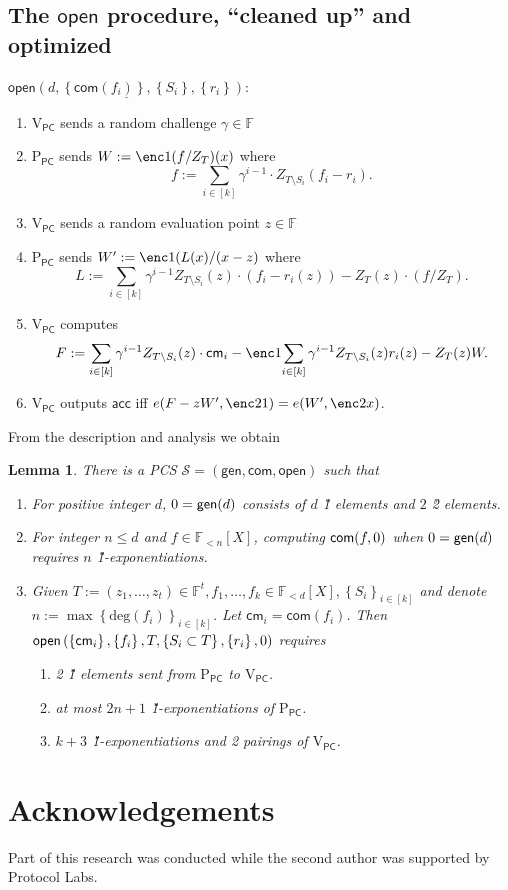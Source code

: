 \documentclass[11pt]{article} %
\newcommand{\F}{\ensuremath{\mathbb F}\xspace}
\newcommand{\com}{\ensuremath{\mathsf{com}}\xspace}
\newcommand{\cm}{\ensuremath{\mathsf{cm}}\xspace}
\newcommand{\open}{\ensuremath{\mathsf{open}}\xspace}
\renewcommand{\deg}{\ensuremath{\mathrm{deg}}\xspace}
\newcommand{\acc}{\ensuremath{\mathsf{acc}}\xspace}
\newcommand{\defeq}{:=}
\newcommand{\sett}[2]{\ensuremath{\set{#1}_{#2}}\xspace}
\newcommand{\gen}{\ensuremath{\mathsf{gen}}\xspace}
\newcommand{\prvpc}{\ensuremath{\mathrm{P_{\mathsf{PC}}}}\xspace}
\newcommand{\verpc}{\ensuremath{\mathrm{V_{\mathsf{PC}}}}\xspace}
\newcommand{\set}[1]{\ensuremath{\left\{#1\right\}}\xspace}
\newcommand{\polysofdeg}[1]{\ensuremath{\F_{< #1}[X]}\xspace}
\newcommand{\PCscheme}{\ensuremath{\mathscr{S}}\xspace}
\newtheorem{lemma}{Lemma}[section]
\begin{document}
 
 \subsection{The \open procedure, ``cleaned up'' and optimized}
 
$\underline{\open(d,\set{\com(f_i)},\set{S_i},\set{r_i})}$:
     \begin{enumerate}
    \item \verpc sends a random challenge $\gamma\in \F$
    \item\label{stp:W} \prvpc sends $W\defeq \enc1{(f/Z_T)(x)}$ where
    \[f\defeq \sum_{i\in [k]} \gamma^{i-1}\cdot  Z_{T\setminus S_i}(f_i-r_i).\]
    \item \verpc sends a random evaluation point $z\in \F$
    \item\label{step:W'} \prvpc sends $W'\defeq \enc1{(L(x)/(x-z)}$ where
    \[L\defeq \sum_{i\in [k]} \gamma^{i-1}Z_{T\setminus S_i}(z)\cdot (f_i-r_i(z)) - Z_T(z)\cdot (f/Z_T).\]
    \item \verpc computes
     \[F\defeq \sum_{i\in [k]} \gamma^{i-1}  Z_{T\setminus S_i}(z)\cdot \cm_i - \enc1{\sum_{i\in [k]} \gamma^{i-1} Z_{T\setminus S_i}(z)r_i(z)} - Z_T(z)W.\]
    \item \verpc outputs \acc iff $e(F-zW',\enc2{1}) = e(W',\enc2{x})$.
    \end{enumerate}

From the description and analysis we obtain 
\begin{lemma}\label{lem:multikateG1}
There is a PCS $\PCscheme=(\gen,\com,\open)$ such that
  \begin{enumerate}
\item For positive integer $d$, $\srs0=\gen(d)$ consists of $d$ \G1 elements and $2$ \G2 elements.
  \item For integer $n\leq d$ and $f\in \polysofdeg{n}$, computing $\com(f,\srs0)$ when $\srs0=\gen(d)$ requires $n$ \G1-exponentiations.
   \item Given $T \defeq (z_1,\ldots,z_t)\in \F^t, f_1,\ldots, f_k \in \polysofdeg{d}, \sett{S_i}{i\in [k]}$   and denote $n \defeq \max\sett{\deg(f_i)}{i\in [k]}$.
   Let $\cm_i = \com(f_i)$.
   Then $\open\left(\set{\cm_i},\set{f_i},T,\set{S_i\subset T},\set{r_i},\srs0 \right)$ requires

    \begin{enumerate}
    \item 2 \G1 elements sent from \prvpc to \verpc.
    \item at most $2n+1$ \G1-exponentiations of \prvpc.
    \item $k+3$ \G1-exponentiations and 2 pairings of \verpc.
\end{enumerate}
\end{enumerate}


\end{lemma}

\section*{Acknowledgements}
Part of this research was conducted while the second author was supported by Protocol Labs.


\end{document}

